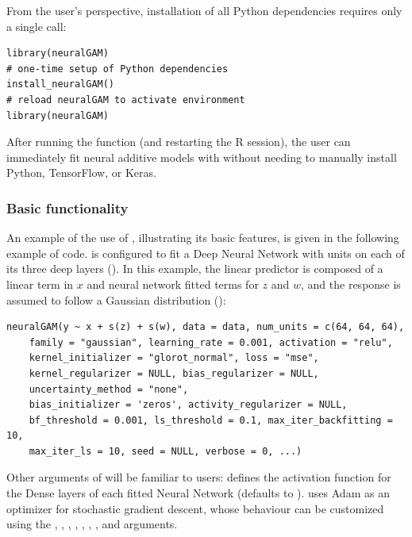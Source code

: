 From the user’s perspective, installation of all Python dependencies requires only a single call:

\begin{verbatim}
library(neuralGAM)
# one-time setup of Python dependencies
install_neuralGAM()
# reload neuralGAM to activate environment
library(neuralGAM)  
\end{verbatim}

After running the function (and restarting the \textsf{R} session), the user can immediately fit neural additive models with  without needing to manually install Python, TensorFlow, or Keras.

\subsubsection{Basic functionality}

An example of the use of , illustrating its basic features, is given in the following example of code.  is configured to fit a Deep Neural Network with  units on each of its three deep layers (). In this example, the linear predictor is composed of a linear term in $x$ and neural network fitted terms for $z$ and $w$, and the response is assumed to follow a Gaussian distribution ():

\begin{Verbatim}
neuralGAM(y ~ x + s(z) + s(w), data = data, num_units = c(64, 64, 64),
    family = "gaussian", learning_rate = 0.001, activation = "relu",
    kernel_initializer = "glorot_normal", loss = "mse", 
    kernel_regularizer = NULL, bias_regularizer = NULL,
    uncertainty_method = "none",
    bias_initializer = 'zeros', activity_regularizer = NULL,
    bf_threshold = 0.001, ls_threshold = 0.1, max_iter_backfitting = 10,
    max_iter_ls = 10, seed = NULL, verbose = 0, ...)
\end{Verbatim}

Other arguments of  will be familiar to  users:  defines the activation function for the Dense layers of each fitted Neural Network (defaults to ).  uses Adam \citep{kingma2014adam} as an optimizer for stochastic gradient descent, whose behaviour can be customized using the , , , , , , , and  arguments.


